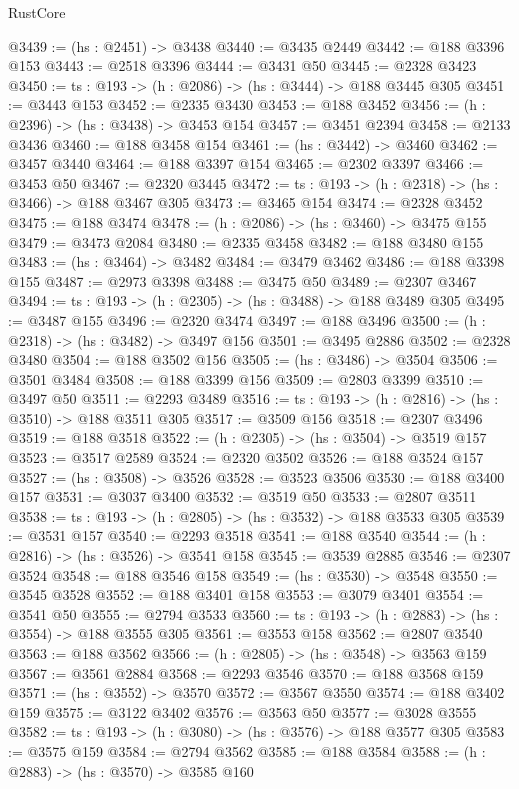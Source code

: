 \begin{lexlean}{RustCore}
\begin{coremodule}
@3439 := (hs : @2451) -> @3438
@3440 := @3435 @2449
@3442 := @188 @3396 @153
@3443 := @2518 @3396
@3444 := @3431 @50
@3445 := @2328 @3423
@3450 := {ts : @193} -> (h : @2086) -> (hs : @3444) -> @188 @3445 @305
@3451 := @3443 @153
@3452 := @2335 @3430
@3453 := @188 @3452
@3456 := (h : @2396) -> (hs : @3438) -> @3453 @154
@3457 := @3451 @2394
@3458 := @2133 @3436
@3460 := @188 @3458 @154
@3461 := (hs : @3442) -> @3460
@3462 := @3457 @3440
@3464 := @188 @3397 @154
@3465 := @2302 @3397
@3466 := @3453 @50
@3467 := @2320 @3445
@3472 := {ts : @193} -> (h : @2318) -> (hs : @3466) -> @188 @3467 @305
@3473 := @3465 @154
@3474 := @2328 @3452
@3475 := @188 @3474
@3478 := (h : @2086) -> (hs : @3460) -> @3475 @155
@3479 := @3473 @2084
@3480 := @2335 @3458
@3482 := @188 @3480 @155
@3483 := (hs : @3464) -> @3482
@3484 := @3479 @3462
@3486 := @188 @3398 @155
@3487 := @2973 @3398
@3488 := @3475 @50
@3489 := @2307 @3467
@3494 := {ts : @193} -> (h : @2305) -> (hs : @3488) -> @188 @3489 @305
@3495 := @3487 @155
@3496 := @2320 @3474
@3497 := @188 @3496
@3500 := (h : @2318) -> (hs : @3482) -> @3497 @156
@3501 := @3495 @2886
@3502 := @2328 @3480
@3504 := @188 @3502 @156
@3505 := (hs : @3486) -> @3504
@3506 := @3501 @3484
@3508 := @188 @3399 @156
@3509 := @2803 @3399
@3510 := @3497 @50
@3511 := @2293 @3489
@3516 := {ts : @193} -> (h : @2816) -> (hs : @3510) -> @188 @3511 @305
@3517 := @3509 @156
@3518 := @2307 @3496
@3519 := @188 @3518
@3522 := (h : @2305) -> (hs : @3504) -> @3519 @157
@3523 := @3517 @2589
@3524 := @2320 @3502
@3526 := @188 @3524 @157
@3527 := (hs : @3508) -> @3526
@3528 := @3523 @3506
@3530 := @188 @3400 @157
@3531 := @3037 @3400
@3532 := @3519 @50
@3533 := @2807 @3511
@3538 := {ts : @193} -> (h : @2805) -> (hs : @3532) -> @188 @3533 @305
@3539 := @3531 @157
@3540 := @2293 @3518
@3541 := @188 @3540
@3544 := (h : @2816) -> (hs : @3526) -> @3541 @158
@3545 := @3539 @2885
@3546 := @2307 @3524
@3548 := @188 @3546 @158
@3549 := (hs : @3530) -> @3548
@3550 := @3545 @3528
@3552 := @188 @3401 @158
@3553 := @3079 @3401
@3554 := @3541 @50
@3555 := @2794 @3533
@3560 := {ts : @193} -> (h : @2883) -> (hs : @3554) -> @188 @3555 @305
@3561 := @3553 @158
@3562 := @2807 @3540
@3563 := @188 @3562
@3566 := (h : @2805) -> (hs : @3548) -> @3563 @159
@3567 := @3561 @2884
@3568 := @2293 @3546
@3570 := @188 @3568 @159
@3571 := (hs : @3552) -> @3570
@3572 := @3567 @3550
@3574 := @188 @3402 @159
@3575 := @3122 @3402
@3576 := @3563 @50
@3577 := @3028 @3555
@3582 := {ts : @193} -> (h : @3080) -> (hs : @3576) -> @188 @3577 @305
@3583 := @3575 @159
@3584 := @2794 @3562
@3585 := @188 @3584
@3588 := (h : @2883) -> (hs : @3570) -> @3585 @160

\end{coremodule}
\end{lexlean}
